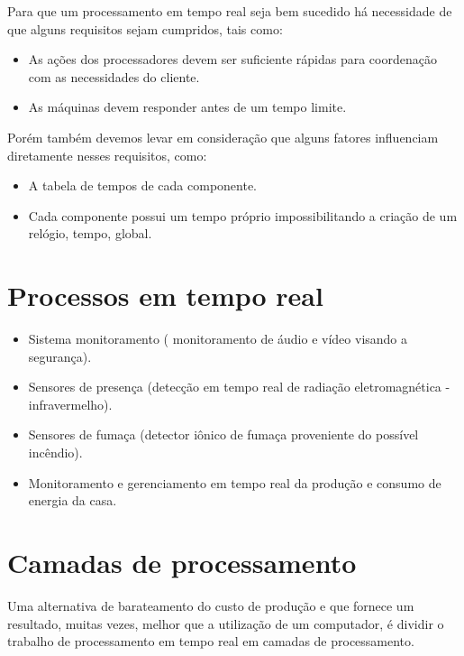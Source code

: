 	Para que um processamento em tempo real seja bem sucedido há necessidade de que alguns requisitos sejam cumpridos, tais como:

\begin{itemize}
	\item As ações dos processadores devem ser suficiente rápidas para coordenação com as necessidades do cliente.
	\item As máquinas devem responder antes de um tempo limite.
\end{itemize}

	Porém também devemos levar em consideração que alguns fatores influenciam diretamente nesses requisitos, como:

\begin{itemize}
	\item A tabela de tempos de cada componente.
	\item Cada componente possui um tempo próprio impossibilitando a criação de um relógio, tempo, global.
\end{itemize}

\section{Processos em tempo real}

\begin{itemize}
	\item Sistema monitoramento ( monitoramento de áudio e vídeo visando a segurança).
	\item Sensores de presença (detecção em tempo real de radiação eletromagnética - infravermelho).
	\item Sensores de fumaça (detector iônico de fumaça proveniente do possível incêndio).
	\item Monitoramento e gerenciamento em tempo real da produção e consumo de energia da casa. 
\end{itemize}

\section{Camadas de processamento}
	
	Uma alternativa de barateamento do custo de produção e que fornece um resultado, muitas vezes, melhor que a utilização de um computador, é dividir o trabalho de processamento em tempo real em camadas de processamento.

